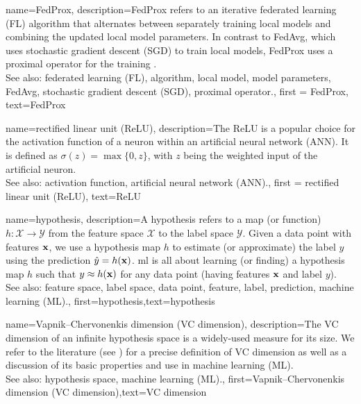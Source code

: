 {name={FedProx},
	description={FedProx refers to an iterative federated learning (FL) algorithm that alternates between separately training local models and combining the updated local model parameters. In contrast to FedAvg, which uses 
		stochastic gradient descent (SGD) to train local models, FedProx uses a proximal operator for the training \cite{FedProx2020}.
					\\ 
		See also: federated learning (FL), algorithm, local model, model parameters, FedAvg, stochastic gradient descent (SGD), proximal operator.}, 
	first = {FedProx}, text={FedProx} 
}

{name={rectified linear unit (ReLU)},
	description={The ReLU is 
		a popular choice for the activation function of a neuron within an artificial neural network (ANN). It is defined 
		as $\sigma(z) = \max\{0,z\}$, with $z$ being the weighted input of the artificial 
		neuron.
					\\ 
		See also: activation function, artificial neural network (ANN).}, first = {rectified linear unit (ReLU)}, text={ReLU} 
}

{name={hypothesis},
	description={A hypothesis refers to a map (or function) $h: \mathcal{X} \rightarrow \mathcal{Y}$ from the 
		feature space $\mathcal{X}$ to the label space $\mathcal{Y}$. 
		Given a data point with features ${\bf x}$, we use a hypothesis map $h$
		to estimate (or approximate) the label $y$ using the prediction  
		$\hat{y} = h({\bf x})$. \Gls{ml} is all about learning (or finding) a 
		hypothesis map $h$ such that $y \approx h({\bf x})$ 
		for any data point (having features ${\bf x}$ and label $y$).
					\\ 
		See also: feature space, label space, data point, feature, label, prediction, machine learning (ML).},
	first={hypothesis},text={hypothesis}  
}



{name={Vapnik–Chervonenkis dimension (VC dimension)},
	description={The VC dimension of an infinite hypothesis space is a widely-used measure 
		for its size. We refer to the literature (see \cite{ShalevMLBook}) for a precise definition of VC dimension 
		as well as a discussion of its basic properties and use in machine learning (ML).
					\\ 
		See also: hypothesis space, machine learning (ML).},
	first={Vapnik–Chervonenkis dimension (VC dimension)},text={VC dimension}  
}

